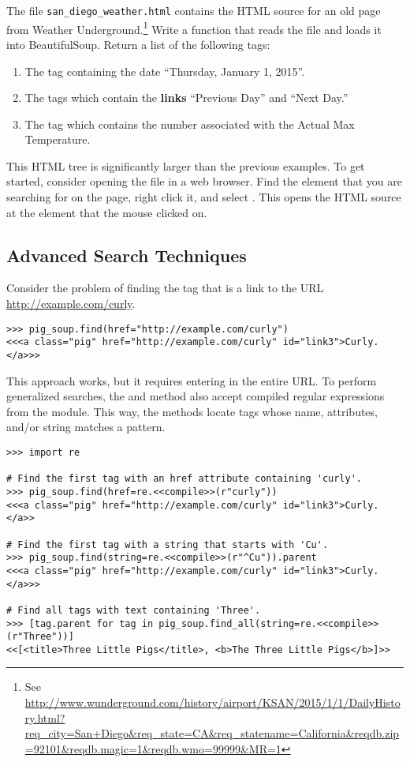 \begin{problem}
The file \texttt{san\_diego\_weather.html} contains the HTML source for an old page from Weather Underground.\footnote{See \url{http://www.wunderground.com/history/airport/KSAN/2015/1/1/DailyHistory.html?req_city=San+Diego&req_state=CA&req_statename=California&reqdb.zip=92101&reqdb.magic=1&reqdb.wmo=99999&MR=1}}
Write a function that reads the file and loads it into BeautifulSoup.
Return a list of the following tags:
\begin{enumerate}
\item The tag containing the date ``Thursday, January 1, 2015''.
\item The tags which contain the \textbf{links} ``Previous Day'' and ``Next Day.''
\item The tag which contains the number associated with the Actual Max Temperature.
\end{enumerate}

This HTML tree is significantly larger than the previous examples.
To get started, consider opening the file in a web browser.
Find the element that you are searching for on the page, right click it, and select .
This opens the HTML source at the element that the mouse clicked on.
\end{problem}

\subsection*{Advanced Search Techniques} %

Consider the problem of finding the tag that is a link to the URL \url{http://example.com/curly}.

\begin{lstlisting}
>>> pig_soup.find(href="http://example.com/curly")
<<<a class="pig" href="http://example.com/curly" id="link3">Curly.</a>>>
\end{lstlisting}

This approach works, but it requires entering in the entire URL.
To perform generalized searches, the  and  method also accept compiled regular expressions from the  module.
This way, the methods locate tags whose name, attributes, and/or string matches a pattern.

\begin{lstlisting}
>>> import re

# Find the first tag with an href attribute containing 'curly'.
>>> pig_soup.find(href=re.<<compile>>(r"curly"))
<<<a class="pig" href="http://example.com/curly" id="link3">Curly.</a>>

# Find the first tag with a string that starts with 'Cu'.
>>> pig_soup.find(string=re.<<compile>>(r"^Cu")).parent
<<<a class="pig" href="http://example.com/curly" id="link3">Curly.</a>>>

# Find all tags with text containing 'Three'.
>>> [tag.parent for tag in pig_soup.find_all(string=re.<<compile>>(r"Three"))]
<<[<title>Three Little Pigs</title>, <b>The Three Little Pigs</b>]>>
\end{lstlisting}

